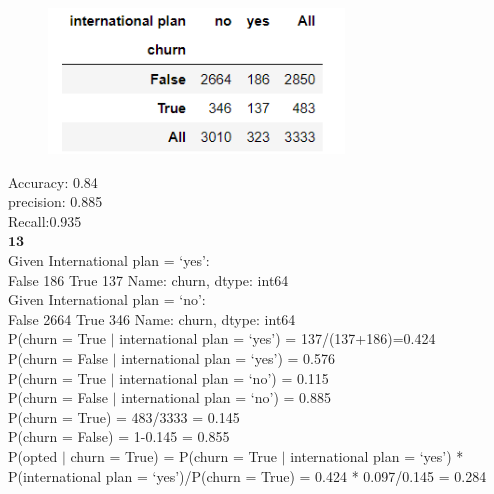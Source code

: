 \documentclass[12pt]{article}
\begin{document}
\begin{figure}[H] 
\centering 
\includegraphics[width=0.7\textwidth]{model1} 
\end{figure}

Accuracy: 0.84\\

precision: 0.885\\

Recall:0.935\\

$\textbf{13}$\\

Given International plan = ‘yes’:\\

False    186
True     137
Name: churn, dtype: int64\\

Given International plan = ‘no’:\\

False    2664
True      346
Name: churn, dtype: int64\\

P(churn = True $ | $ international plan = ‘yes’) = 137/(137+186)=0.424\\

P(churn = False $ | $ international plan = ‘yes’) =
0.576\\

P(churn = True $ | $ international plan = ‘no’) =
0.115\\

P(churn = False $ | $ international plan = ‘no’) =
0.885\\

P(churn = True) = 483/3333 = 0.145\\

P(churn = False) = 1-0.145 = 0.855\\

P(opted $ | $ churn = True) = P(churn = True $ | $ international plan = ‘yes’) * P(international plan = ‘yes’)/P(churn = True) = 0.424 * 0.097/0.145 = 0.284\\
\end{document}

